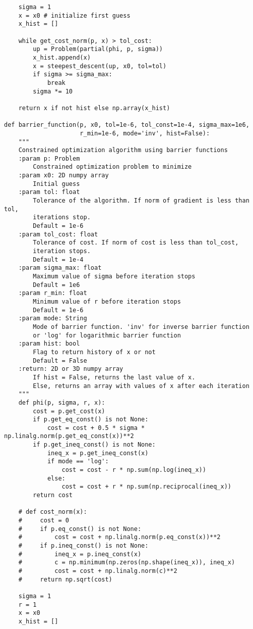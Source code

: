 \begin{lstlisting}
    sigma = 1
    x = x0 # initialize first guess
    x_hist = []

    while get_cost_norm(p, x) > tol_cost:
        up = Problem(partial(phi, p, sigma))
        x_hist.append(x)
        x = steepest_descent(up, x0, tol=tol)
        if sigma >= sigma_max:
            break
        sigma *= 10

    return x if not hist else np.array(x_hist)

def barrier_function(p, x0, tol=1e-6, tol_const=1e-4, sigma_max=1e6,
                     r_min=1e-6, mode='inv', hist=False):
    """
    Constrained optimization algorithm using barrier functions
    :param p: Problem
        Constrained optimization problem to minimize
    :param x0: 2D numpy array
        Initial guess
    :param tol: float
        Tolerance of the algorithm. If norm of gradient is less than tol,
        iterations stop.
        Default = 1e-6
    :param tol_cost: float
        Tolerance of cost. If norm of cost is less than tol_cost,
        iteration stops.
        Default = 1e-4
    :param sigma_max: float
        Maximum value of sigma before iteration stops
        Default = 1e6
    :param r_min: float
        Minimum value of r before iteration stops
        Default = 1e-6
    :param mode: String
        Mode of barrier function. 'inv' for inverse barrier function
        or 'log' for logarithmic barrier function
    :param hist: bool
        Flag to return history of x or not
        Default = False
    :return: 2D or 3D numpy array
        If hist = False, returns the last value of x.
        Else, returns an array with values of x after each iteration
    """
    def phi(p, sigma, r, x):
        cost = p.get_cost(x)
        if p.get_eq_const() is not None:
            cost = cost + 0.5 * sigma * np.linalg.norm(p.get_eq_const(x))**2
        if p.get_ineq_const() is not None:
            ineq_x = p.get_ineq_const(x)
            if mode == 'log':
                cost = cost - r * np.sum(np.log(ineq_x))
            else:
                cost = cost + r * np.sum(np.reciprocal(ineq_x))
        return cost

    # def cost_norm(x):
    #     cost = 0
    #     if p.eq_const() is not None:
    #         cost = cost + np.linalg.norm(p.eq_const(x))**2
    #     if p.ineq_const() is not None:
    #         ineq_x = p.ineq_const(x)
    #         c = np.minimum(np.zeros(np.shape(ineq_x)), ineq_x)
    #         cost = cost + np.linalg.norm(c)**2
    #     return np.sqrt(cost)

    sigma = 1
    r = 1
    x = x0
    x_hist = []


\end{lstlisting}
